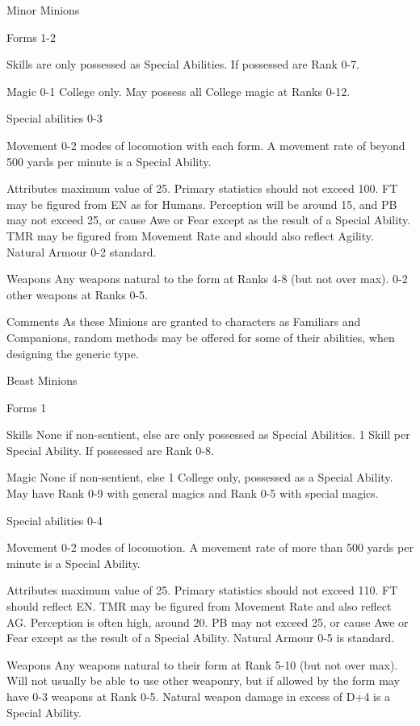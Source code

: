 \begin{Description}
\item[Minor Minions]
\begin{Description}
\item[Forms] 1-2
\item[Skills] are only possessed as Special Abilities. If possessed are Rank 0-7.
\item[Magic] 0-1 College only. May possess all College magic at Ranks 0-12.
\item[Special abilities] 0-3
\item[Movement] 0-2 modes of locomotion with each form.  A movement rate of beyond 500 yards per minute is a Special Ability.
\item[Attributes] maximum value of 25.  Primary statistics should not exceed 100.  FT may be figured from EN as for Humans.  Perception will be around 15, and PB may not exceed 25, or cause Awe or Fear except as the result of a Special Ability.  TMR may be figured from Movement Rate and should also reflect Agility. Natural Armour 0-2 standard.
\item[Weapons] Any weapons natural to the form at Ranks 4-8 (but not over max).  0-2 other weapons at Ranks 0-5.
\item[Comments] As these Minions are granted to characters as Familiars and Companions, random methods may be offered for some of their abilities, when designing the generic type.
\end{Description}

\item[Beast Minions]
\begin{Description}
\item[Forms] 1
\item[Skills] None if non-sentient, else are only possessed as Special Abilities. 1 Skill per Special Ability.  If possessed are Rank 0-8.
\item[Magic] None if non-sentient, else 1 College only, possessed as a Special Ability. May have Rank 0-9 with general magics and Rank 0-5 with special magics.
\item[Special abilities] 0-4
\item[Movement] 0-2 modes of locomotion.  A movement rate of more than 500 yards per minute is a Special Ability.
\item[Attributes] maximum value of 25.  Primary statistics should not exceed 110. FT should reflect EN. TMR may be figured from Movement Rate and also reflect AG.  Perception is often high, around 20. PB may not exceed 25, or cause Awe or Fear except as the result of a Special Ability. Natural Armour 0-5 is standard.
\item[Weapons] Any weapons natural to their form at Rank 5-10 (but not over max). Will not usually be able to use other weaponry, but if allowed by the form may have 0-3 weapons at Rank 0-5. Natural weapon damage in excess of D+4 is a Special Ability.
\end{Description}


\end{Description}
